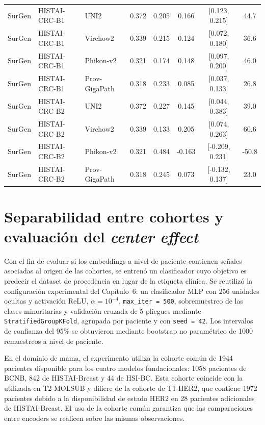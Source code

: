 \begin{table}[H]
{\begin{tabular}{l l l c c c c c}
\midrule
SurGen & HISTAI-CRC-B1 & UNI2 & 0.372 & 0.205 & 0.166 & [0.123, 0.215] & 44.7 \\
SurGen & HISTAI-CRC-B1 & Virchow2 & 0.339 & 0.215 & 0.124 & [0.072, 0.180] & 36.6 \\
SurGen & HISTAI-CRC-B1 & Phikon-v2 & 0.321 & 0.174 & 0.148 & [0.097, 0.200] & 46.0 \\
SurGen & HISTAI-CRC-B1 & Prov-GigaPath & 0.318 & 0.233 & 0.085 & [0.037, 0.133] & 26.8 \\
\midrule
SurGen & HISTAI-CRC-B2 & UNI2 & 0.372 & 0.227 & 0.145 & [0.044, 0.383] & 39.0 \\
SurGen & HISTAI-CRC-B2 & Virchow2 & 0.339 & 0.133 & 0.205 & [0.074, 0.263] & 60.6 \\
SurGen & HISTAI-CRC-B2 & Phikon-v2 & 0.321 & 0.484 & -0.163 & [-0.209, 0.231] & -50.8 \\
SurGen & HISTAI-CRC-B2 & Prov-GigaPath & 0.318 & 0.245 & 0.073 & [-0.132, 0.137] & 23.0 \\
\midrule
\bottomrule
\end{tabular}
}
\end{table}


\section{Separabilidad entre cohortes y evaluación del \textit{center effect}}

\label{appendix:center_effect}

Con el fin de evaluar si los embeddings a nivel de paciente contienen señales asociadas al origen de las cohortes, se entrenó un clasificador cuyo objetivo es predecir el dataset de procedencia en lugar de la etiqueta clínica. Se reutilizó la configuración experimental del Capítulo~6: un clasificador MLP con 256 unidades ocultas y activación ReLU, $\alpha = 10^{-4}$, \texttt{max\_iter = 500}, sobremuestreo de las clases minoritarias y validación cruzada de 5 pliegues mediante \texttt{StratifiedGroupKFold}, agrupada por paciente y con \texttt{seed = 42}. Los intervalos de confianza del 95\% se obtuvieron mediante bootstrap no paramétrico de 1000 remuestreos a nivel de paciente.

En el dominio de mama, el experimento utiliza la cohorte común de 1944 pacientes disponible para los cuatro modelos fundacionales: 1058 pacientes de BCNB, 842 de HISTAI-Breast y 44 de HSI-BC. Esta cohorte coincide con la utilizada en T2-MOLSUB y difiere de la cohorte de T1-HER2, que contiene 1972 pacientes debido a la disponibilidad de estado HER2 en 28 pacientes adicionales de HISTAI-Breast. El uso de la cohorte común garantiza que las comparaciones entre encoders se realicen sobre las mismas observaciones.


